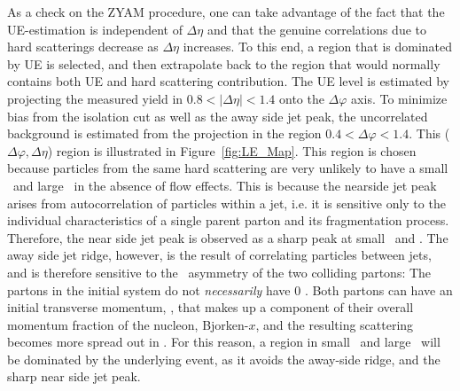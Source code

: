 As a check on the ZYAM procedure, one can take advantage of the fact that the UE-estimation is independent of $\Delta\eta$ and that the genuine correlations due to hard scatterings decrease as $\Delta\eta$ increases. To this end, a region that is dominated by UE is selected, and then extrapolate back to the region that would normally contains both UE and hard scattering contribution. The UE level is estimated by projecting the measured yield in $0.8 < |\Delta\eta| < 1.4$ onto the $\Delta\varphi$ axis. To minimize bias from the isolation cut as well as the away side jet peak, the uncorrelated background is estimated from the projection in the region $0.4 < \Delta\varphi < 1.4$. This ($\Delta\varphi,\Delta\eta$) region is illustrated in Figure~\ref{fig:LE_Map}. This region is chosen because particles from the same hard scattering are very unlikely to have a small \deltaphi~and large \deltaeta~in the absence of flow effects. This is because the nearside jet peak arises from autocorrelation of particles within a jet, i.e. it is sensitive only to the individual characteristics of a single parent parton and its fragmentation process. Therefore, the near side jet peak is observed as a sharp peak at small \deltaphi~and \deltaeta. The away side jet ridge, however, is the result of correlating particles between jets, and is therefore sensitive to the \kt~asymmetry of the two colliding partons: The partons in the initial system  do not \textit{necessarily} have 0 \pt. Both partons can have an initial transverse momentum, \kt, that makes up a component of their overall momentum fraction of the nucleon, Bjorken-$x$, and the resulting scattering becomes more spread out in \deltaeta. For this reason, a region in small \deltaphi~and large \deltaeta~will be dominated by the underlying event, as it avoids the away-side ridge, and the sharp near side jet peak.

